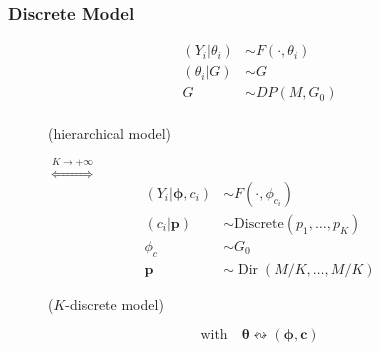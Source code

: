 \begin{frame} %
	\frametitle{Discrete Model}
	\begin{figure}[htpb] 
    	    \begin{align*}
  	 		    (Y_{i}|\theta_{i})&\sim F(\cdot,\theta_i) \\
    	        (\theta_{i}|G)&\sim G \\
            	G & \sim DP(M,G_{0}) \\
      		\end{align*}
        	\begin{center}
        		(hierarchical model)
        	\end{center}
		\endminipage 
			$\stackrel{K\to+\infty}{\iff}$
		\endminipage
        	\begin{align*}
            	(Y_{i}|\mathbf{\phi},c_{i})&\sim F(\cdot,\phi_{c_{i}}) \\
            	(c_{i}|\mathit{\mathbf{p}})&\sim \text{Discrete}(\mathit{p_{1}},\dots,\mathit{p_{K}})\\
            	\phi_{c} & \sim G_{0} \\
            	\mathbf{p} &\sim \operatorname{Dir}(M/K,\dots,M/K)
        	\end{align*}
        	\begin{center}
        		($K$-discrete model)
        	\end{center}
		\endminipage  
	\end{figure}
	\begin{center}
		\vspace{20pt}
		$$\text{with} \quad \boldsymbol\theta \leftrightsquigarrow (\boldsymbol\phi, \mathbf c)$$
	\end{center}
\end{frame}




